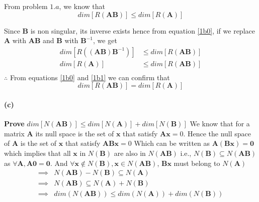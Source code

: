 \documentclass[12pt, letterpaper]{article}
\begin{document}
From problem $1.a$, we know that
\begin{equation}\label{1b0}
  dim[R(\mathbf{AB})] \leq dim[R(\mathbf{A})]
\end{equation}

Since \textbf{B} is non singular, its inverse exists hence from equation \ref{1b0}, if we replace \textbf{A} with \textbf{AB} and \textbf{B} with $\mathbf{B}^{-1}$, we get
\begin{equation}\label{1b1}
  \begin{split}
    dim[R((\mathbf{AB})\mathbf{B}^{-1})] &\leq dim[R(\mathbf{AB})]\\
    dim[R(\mathbf{A})] &\leq dim[R(\mathbf{AB})]\\
  \end{split}
\end{equation}
$\therefore$ From equations \ref{1b0} and \ref{1b1} we can confirm that
\[\boxed{dim[R(\mathbf{AB})] = dim[R(\mathbf{A})]}\]

\paragraph{(c)} \textbf{Prove} $dim[N(\mathbf{AB})] \leq dim[N(\mathbf{A})] + dim[N(\mathbf{B})]$
\newline\newline
We know that for a matrix $\mathbf{A}$ its null space is the set of $\mathbf{x}$ that satisfy $\mathbf{Ax} = 0$.
Hence the null space of $\mathbf{A}$ is the set of $\mathbf{x}$ that satisfy $\mathbf{ABx} = 0$
\newline\newline
Which can be written as $\mathbf{A}(\mathbf{Bx}) = \mathbf{0}$
which implies that all $\mathbf{x}$ in $N(\mathbf{B})$ are also in $N(\mathbf{AB})$ i.e., $N(\mathbf{B}) \subseteq N(\mathbf{AB})$ as $ \forall \mathbf{A}, \mathbf{A0} = \mathbf{0}$.
And $\forall \mathbf{x} \not\in N(\mathbf{B}), \mathbf{x} \in N(\mathbf{AB})$, $\mathbf{Bx}$ must belong to $N(\mathbf{A})$
\[
  \begin{split}
    \implies &N(\mathbf{AB}) - N(\mathbf{B}) \subseteq N(\mathbf{A})\\
    \implies &N(\mathbf{AB}) \subseteq N(\mathbf{A}) + N(\mathbf{B})\\
    \implies &\boxed{dim(N(\mathbf{AB})) \leq dim(N(\mathbf{A})) + dim(N(\mathbf{B}))}\\
  \end{split}
\]
\end{document}
